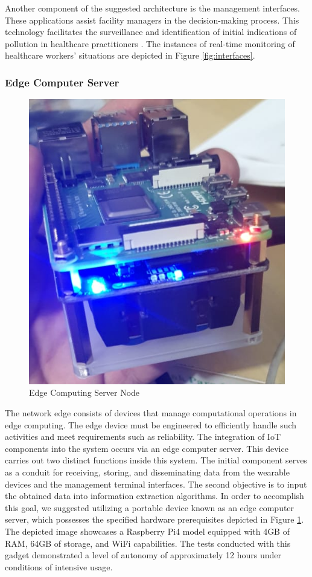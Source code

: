 Another component of the suggested architecture is the management interfaces. These applications assist facility managers in the decision-making process. This technology facilitates the surveillance and identification of initial indications of pollution in healthcare practitioners \cite{doi:10.1111/acem.14053}. The instances of real-time monitoring of healthcare workers' situations are depicted in Figure \ref{fig:interfaces}.

\subsubsection{Edge Computer Server} 

\begin{figure}[h!]
    \centering
    \includegraphics[width=.4\linewidth]{Figures/edge-server.png}
    \caption{Edge Computing Server Node}
    \label{fig:edgecomputer}
\end{figure}

The network edge consists of devices that manage computational operations in edge computing. The edge device must be engineered to efficiently handle such activities and meet requirements such as reliability. The integration of IoT components into the system occurs via an edge computer server. This device carries out two distinct functions inside this system. The initial component serves as a conduit for receiving, storing, and disseminating data from the wearable devices and the management terminal interfaces. The second objective is to input the obtained data into information extraction algorithms. In order to accomplish this goal, we suggested utilizing a portable device known as an edge computer server, which possesses the specified hardware prerequisites depicted in Figure \ref{fig:edgecomputer}. The depicted image showcases a Raspberry Pi4 model equipped with 4GB of RAM, 64GB of storage, and WiFi capabilities. The tests conducted with this gadget demonstrated a level of autonomy of approximately 12 hours under conditions of intensive usage.

